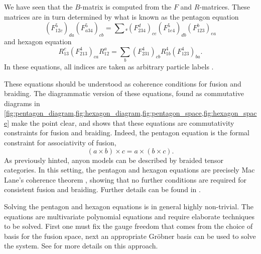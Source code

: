 We have seen that the $B$-matrix is computed from the $F$ and $R$-matrices. These matrices are in turn determined by what is known as the pentagon equation
\begin{equation}\label{eq:pentagon}
  \left(F_{12c}^5\right)_{da} \left(F_{a34}^5\right)_{cb} = ∑ₑ\left(F_{234}^d\right)_{ce} \left( F_{1e4}^5 \right)_{db} \left( F_{123}^b \right)_{ea}
\end{equation}
and hexagon equation
\begin{equation}\label{eq:hexagon}
  R_{13}^c \left(F_{213}^4\right)_{ca} R_{12}^a = \sum_{b} \left(F_{231}^4\right)_{cb} R_{1b}^4 \left(F_{123}^4\right)_{ba}.
\end{equation}
In these equations, all indices are taken as arbitrary particle labels \cite{preskill}.

These equations should be understood as coherence conditions for fusion and braiding. The diagrammatic version of these equations, found as commutative diagrams in \cref{fig:pentagon_diagram,fig:hexagon_diagram,fig:pentagon_space,fig:hexagon_space} make the point clear, and shows that these equations are commutativity constraints for fusion and braiding. Indeed, the pentagon equation is the formal constraint for associativity of fusion,
\begin{equation}
  (a \times b) \times c = a \times (b \times c).
\end{equation}
As previously hinted, anyon models can be described by braided tensor categories. In this setting, the pentagon and hexagon equations are precisely Mac Lane's coherence theorem \cite{mac lane}, showing that no further conditions are required for consistent fusion and braiding. Further details can be found in \cite{kitaev,preskill}.

Solving the pentagon and hexagon equations is in general highly non-trivial. The equations are multivariate polynomial equations and require elaborate techniques to be solved. First one must fix the gauge freedom that comes from the choice of basis for the fusion space, next an appropriate Gröbner basis can be used to solve the system. See \cite{bonderson} for more details on this approach.

